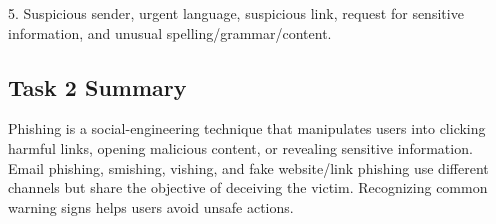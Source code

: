 \documentclass[12pt,a4paper]{article}
\begin{document}
5. Suspicious sender, urgent language, suspicious link, request for sensitive information, and unusual spelling/grammar/content.


\subsection{Task 2 Summary}

Phishing is a social-engineering technique that manipulates users into clicking harmful links, opening malicious content, or revealing sensitive information. Email phishing, smishing, vishing, and fake website/link phishing use different channels but share the objective of deceiving the victim. Recognizing common warning signs helps users avoid unsafe actions.

\end{document}
